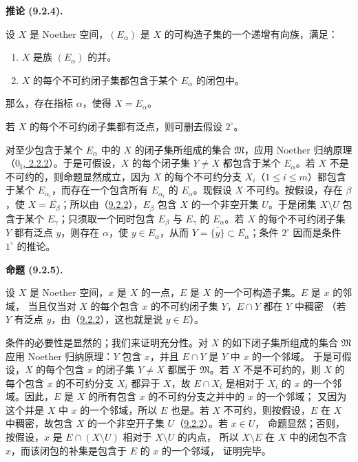 \documentclass[UTF8,fontset=none,11pt,oneside,openany]{ctexbook}
\newenvironment{proposition}[1][]{%
  \par\medskip\noindent\textbf{命题 (#1).}\ %
}{\par}
\newenvironment{corollary}[1][]{%
  \par\medskip\noindent\textbf{推论 (#1).}\ %
}{\par}
\newcommand{\oldpage}[2][]{%
  \hypertarget{ega-source-page-#1-#2}{}%
  \marginnote{\scriptsize\textbf{#1}~|~#2}\ignorespaces}
\let\EGAOriginalLabel\label
\renewcommand{\label}[1]{\phantomsection\EGAOriginalLabel{#1}}
\begin{document}
\begin{corollary}[9.2.4]
\label{0.9.2.4-fr}
设 $X$ 是 Noether 空间，$(E_\alpha)$ 是 $X$ 的可构造子集的一个递增有向族，满足：
\begin{enumerate}
  \item[$1^\circ$] $X$ 是族 $(E_\alpha)$ 的并。
  \item[$2^\circ$] $X$ 的每个不可约闭子集都包含于某个 $E_\alpha$ 的闭包中。
\end{enumerate}
那么，存在指标 $\alpha$，使得 $X=E_\alpha$。

若 $X$ 的每个不可约闭子集都有泛点，则可删去假设 $2^\circ$。
\end{corollary}

对至少包含于某个 $E_\alpha$ 中的 $X$ 的闭子集所组成的集合
$\mathfrak{M}$，应用 Noether 归纳原理
（\hyperref[0.2.2.2-fr]{$0_{\mathrm I}$, 2.2.2}）。于是可假设，$X$ 的每个闭子集
$Y\ne X$ 都包含于某个 $E_\alpha$。若 $X$ 不是不可约的，则命题显然成立，因为 $X$ 的每个不可约分支
$X_i$（$1\leq i\leq m$）都包含于某个 $E_{\alpha_i}$，而存在一个包含所有
$E_{\alpha_i}$ 的 $E_\alpha$。现假设 $X$ 不可约。按假设，存在 $\beta$，使
$X=\overline{E_\beta}$；所以由（\hyperref[0.9.2.2-fr]{9.2.2}），$E_\beta$ 包含 $X$ 的一个非空开集
$U$。于是闭集 $X\setminus U$ 包含于某个 $E_\gamma$；只须取一个同时包含
$E_\beta$ 与 $E_\gamma$ 的 $E_\alpha$。若 $X$ 的每个不可约闭子集 $Y$
\oldpage[0\textsubscript{III}]{16}
都有泛点 $y$，则存在 $\alpha$，使 $y\in E_\alpha$，从而
$Y=\overline{\{y\}}\subset\overline{E_\alpha}$；条件 $2^\circ$ 因而是条件 $1^\circ$ 的推论。

\begin{proposition}[9.2.5]
\label{0.9.2.5-fr}
设 $X$ 是 Noether 空间，$x$ 是 $X$ 的一点，$E$ 是 $X$ 的一个可构造子集。$E$ 是 $x$ 的邻域，
当且仅当对 $X$ 的每个包含 $x$ 的不可约闭子集 $Y$，$E\cap Y$ 都在 $Y$ 中稠密
（若 $Y$ 有泛点 $y$，由（\hyperref[0.9.2.2-fr]{9.2.2}），这也就是说 $y\in E$）。
\end{proposition}

条件的必要性是显然的；我们来证明充分性。对 $X$ 的如下闭子集所组成的集合
$\mathfrak{M}$ 应用 Noether 归纳原理：$Y$ 包含 $x$，并且 $E\cap Y$ 是 $Y$ 中 $x$ 的一个邻域。
于是可假设，$X$ 的每个包含 $x$ 的闭子集 $Y\ne X$ 都属于 $\mathfrak{M}$。若 $X$ 不是不可约的，则
$X$ 的每个包含 $x$ 的不可约分支 $X_i$ 都异于 $X$，故 $E\cap X_i$ 是相对于 $X_i$ 的
$x$ 的一个邻域。因此，$E$ 是 $X$ 的所有包含 $x$ 的不可约分支之并中的 $x$ 的一个邻域；
又因为这个并是 $X$ 中 $x$ 的一个邻域，所以 $E$ 也是。若 $X$ 不可约，则按假设，$E$ 在
$X$ 中稠密，故包含 $X$ 的一个非空开子集 $U$（\hyperref[0.9.2.2-fr]{9.2.2}）。若 $x\in U$，
命题显然；否则，按假设，$x$ 是 $E\cap(X\setminus U)$ 相对于 $X\setminus U$ 的内点，
所以 $X\setminus E$ 在 $X$ 中的闭包不含 $x$，而该闭包的补集是包含于 $E$ 的 $x$ 的一个邻域，
证明完毕。
\end{document}
